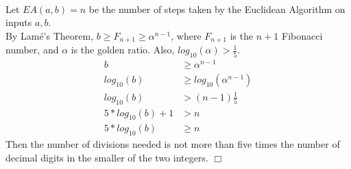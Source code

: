 \documentclass{assignment}
\begin{document}
\begin{problemlist}
\pbitem
\begin{problem}
\end{problem}
\begin{answer}
  \\
  Let $EA(a,b)=n$ be the number of steps taken by the Euclidean Algorithm on inputs $a,b$.\\
  By Lamé's Theorem, $b \ge F_{n+1} \ge \alpha^{n-1}$, where $F_{n+1}$ is the $n+1$ Fibonacci number, and $\alpha$ is the golden ratio. Also, $log_{10}(\alpha) > \frac{1}{5}$.\\
  \begin{align*}
    b &\ge \alpha^{n-1}\\
    log_{10}(b) &\ge log_{10}(\alpha^{n-1})\\
    log_{10}(b) &> (n-1)\frac{1}{5}\\
    5*log_{10}(b) + 1 &> n\\
    5*log_{10}(b) &\ge n
  \end{align*}
  Then the number of divisions needed is not more than five times the number of decimal digits in the smaller of the two integers. $\Box$
\end{answer}


\end{problemlist}
\end{document}
